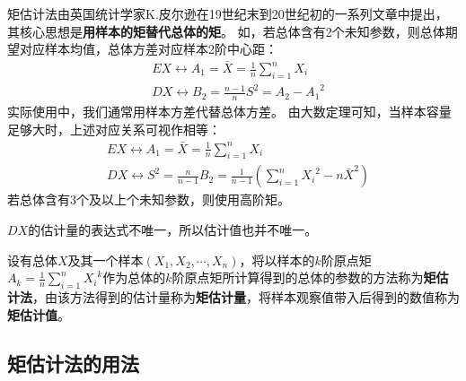 矩估计法由英国统计学家K.皮尔逊在19世纪末到20世纪初的一系列文章中提出，其核心思想是{\bf 用样本的矩替代总体的矩}。
如，若总体含有2个未知参数，则总体期望对应样本均值，总体方差对应样本2阶中心距：
\begin{align*}
&EX\leftrightarrow A_1=\bar{X}=\frac{1}{n}\sum_{i=1}^n{X_i} \\
&DX\leftrightarrow B_2=\frac{n-1}{n}S^2=A_2-{A_1}^2
\end{align*}
实际使用中，我们通常用样本方差代替总体方差。
由大数定理可知，当样本容量足够大时，上述对应关系可视作相等：
\begin{align*}
&EX\leftrightarrow A_1=\bar{X}=\frac{1}{n}\sum_{i=1}^n{X_i} \\
&DX\leftrightarrow S^2=\frac{n}{n-1}B_2=\frac{1}{n-1}\left( \sum_{i=1}^n{{X_i}^2}-n\bar{X}^2 \right)
\end{align*}
若总体含有3个及以上个未知参数，则使用高阶矩。

\begin{tcolorbox}
$DX$的估计量的表达式不唯一，所以估计值也并不唯一。
\end{tcolorbox}

\begin{definition}[矩估计法]
设有总体$X$及其一个样本$\left( X_1,X_2,\cdots ,X_n \right) $，将以样本的$k$阶原点矩$A_k=\frac{1}{n}\sum_{i=1}^n{{X_i}^k}$作为总体的$k$阶原点矩所计算得到的总体的参数的方法称为{\bf 矩估计法}，由该方法得到的估计量称为{\bf 矩估计量}，将样本观察值带入后得到的数值称为{\bf 矩估计值}。
\end{definition}

\subsection{矩估计法的用法}

